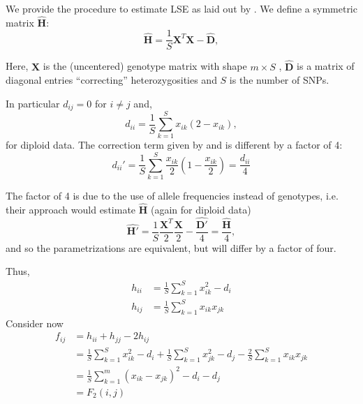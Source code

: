 \documentclass[12pt, letterpaper]{article}
\newcommand{\MX}{\mathbf{X}}
\begin{document}
We provide the procedure to estimate LSE as laid out by \cite{cabreros_likelihood-free_2019}. We define a symmetric matrix $\hat{\mathbf{H}}$:
\begin{equation}
    \hat{\mathbf{H}} = \frac{1}{S}\mathbf{X}^T\mathbf{X} - \hat{\mathbf{D}},
\end{equation}

Here, $\MX$ is the (uncentered) genotype matrix with shape $m \times S$ , $\hat{\mathbf{D}}$ is a matrix of diagonal entries ``correcting'' heterozygosities and $S$ is the number of SNPs.

In particular $d_{ij} = 0 $ for $i \neq j$ and, 
\begin{equation}
    d_{ii} = \frac{1}{S}\sum_{k=1}^S x_{ik}(2-x_{ik}),
\end{equation}
for diploid data. The correction term given by \cite{reich_reconstructing_2009} and \cite{patterson_ancient_2012} is different by a factor of 4:
\begin{equation*}
    d_{ii}' = \frac{1}{S}\sum_{k=1}^S \frac{x_{ik}}{2}(1-\frac{x_{ik}}{2}) = \frac{d_{ii}}{4}
\end{equation*}

The factor of 4 is due to the use of allele frequencies instead of genotypes, i.e. their approach would estimate $\hat{\mathbf{H}}$ (again for diploid data)
\begin{equation*}
    \hat{\mathbf{H}'} = \frac{1}{S}\frac{\mathbf{X}^T}{2}\frac{\mathbf{X}}{2} - \frac{\hat{\mathbf{D'}}}{4} = \frac{\hat{\mathbf{H}}}{4},
\end{equation*}
and so the parametrizations are equivalent, but will differ by a factor of four.

Thus, 
\begin{subequations}\begin{align}
    h_{ii} &= \frac{1}{S}\sum_{k=1}^S x_{ik}^2 - d_i \\
    h_{ij} &= \frac{1}{S}\sum_{k=1}^S x_{ik}x_{jk} 
\end{align}\end{subequations}
Consider now
\begin{align}
    f_{ij} &= h_{ii} + h_{jj} - 2 h_{ij}\nonumber\\
     &= \frac{1}{S}\sum_{k=1}^S x_{ik}^2 - d_i + \frac{1}{S}\sum_{k=1}^S x_{jk}^2 - d_j - \frac{2}{S}\sum_{k=1}^S x_{ik}x_{jk}\nonumber \\
    &= \frac{1}{S} \sum_{k=1}^m (x_{ik} - x_{jk})^2 - d_i - d_j \\
    &= F_2(i,j)\nonumber
\end{align}
\end{document}
